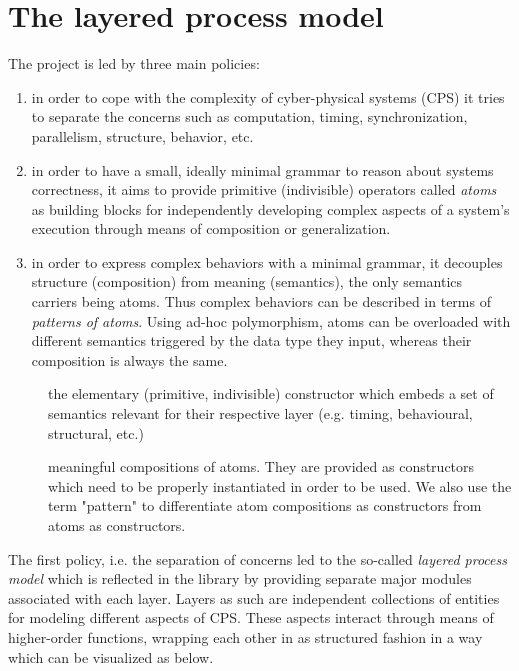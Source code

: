 \section{The layered process model}
The  project is led by three main policies:\par
\begin{enumerate}
\item 
in order to cope with the complexity of cyber-physical systems
 (CPS) it tries to separate the concerns such as computation,
 timing, synchronization, parallelism, structure, behavior, etc.\par

\item 
in order to have a small, ideally minimal grammar to reason
 about systems correctness, it aims to provide primitive
 (indivisible) operators called \emph{atoms} as building blocks for
 independently developing complex aspects of a system's execution
 through means of composition or generalization.\par

\item 
in order to express complex behaviors with a minimal grammar,
 it decouples structure (composition) from meaning (semantics),
 the only semantics carriers being atoms. Thus complex behaviors
 can be described in terms of \emph{patterns of atoms}. Using ad-hoc
 polymorphism, atoms can be overloaded with different semantics
 triggered by the data type they input, whereas their composition
 is always the same.\par

\end{enumerate}
\begin{description}
\item[] the elementary (primitive, indivisible) constructor
 which embeds a set of semantics relevant for their respective
 layer (e.g. timing, behavioural, structural, etc.)
\item[] meaningful compositions of atoms. They are
 provided as constructors which need to be properly instantiated
 in order to be used. We also use the term "pattern" to
 differentiate atom compositions as constructors from atoms as
 constructors.
\end{description}The first policy, i.e. the separation of concerns led to the
 so-called \emph{layered process model} which is reflected in the
 library by providing separate major modules associated with each
 layer. Layers as such are independent collections of entities for
 modeling different aspects of CPS. These aspects interact through
 means of higher-order functions, wrapping each other in as
 structured fashion in a way which can be visualized as below.\par
                 
